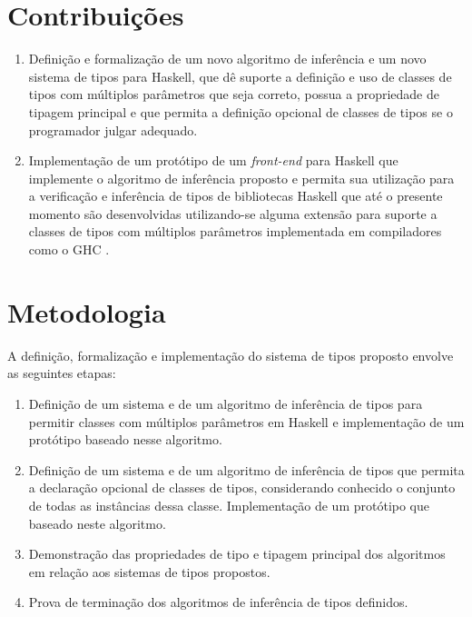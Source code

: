 \section{Contribui\c{c}\~oes}


\begin{enumerate} 
	\item Defini\c{c}\~ao e formaliza\c{c}\~ao de um novo algoritmo de infer\^encia e um novo sistema de tipos 
	      para Haskell, que d\^e suporte a defini\c{c}\~ao e uso de classes
	      de tipos com m\'ultiplos par\^ametros que seja correto, possua a propriedade de tipagem principal e que
	      permita a defini\c{c}\~ao opcional de classes de tipos se o programador julgar adequado. 
	\item Implementa\c{c}\~ao de um prot\'otipo de um \emph{front-end} para Haskell que implemente o algoritmo de 
	      infer\^encia proposto e permita sua utiliza\c{c}\~ao para a verifica\c{c}\~ao e infer\^encia de tipos 
	      de bibliotecas Haskell que
	      at\'e o presente momento s\~ao desenvolvidas utilizando-se alguma extens\~ao para suporte a classes de
	      tipos com m\'ultiplos par\^ametros implementada em compiladores como o GHC \cite{GHC}.	       
\end{enumerate}

\section{Metodologia}

A defini\c{c}\~ao, formaliza\c{c}\~ao e implementa\c{c}\~ao do sistema de tipos proposto envolve as seguintes etapas:

\begin{enumerate}
	\item Defini\c{c}\~ao de um sistema e de um algoritmo de infer\^encia de tipos para permitir classes com m\'ultiplos
	      par\^ametros em Haskell e implementa\c{c}\~ao de um prot\'otipo baseado nesse algoritmo.
    \item Defini\c{c}\~ao de um sistema e de um algoritmo de infer\^encia de  tipos que permita a declara\c{c}\~ao
          opcional de classes de tipos, considerando conhecido
          o conjunto de todas as inst\^ancias dessa classe. Implementa\c{c}\~ao de um 
          prot\'otipo que baseado neste algoritmo.
    \item Demonstra\c{c}\~ao das propriedades de tipo e tipagem principal dos algoritmos em 
          rela\c{c}\~ao aos sistemas de tipos propostos.
    \item Prova de termina\c{c}\~ao dos algoritmos de infer\^encia de tipos definidos.
\end{enumerate} 


